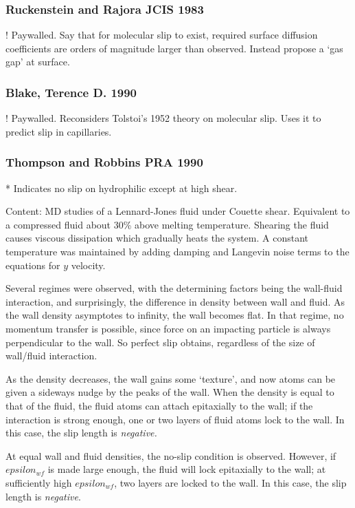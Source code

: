 \documentclass[twocolumn]{article}
\begin{document}
\subsubsection*{Ruckenstein and Rajora JCIS 1983}
! Paywalled.
Say that for molecular slip to exist, required surface diffusion coefficients are orders of magnitude larger than observed. Instead propose a `gas gap' at surface.

\subsubsection*{Blake, Terence D. 1990}
! Paywalled.
Reconsiders Tolstoi's 1952 theory on molecular slip. Uses it to predict slip in capillaries.

\subsubsection*{Thompson and Robbins PRA 1990}
* Indicates no slip on hydrophilic except at high shear.

Content: MD studies of a Lennard-Jones fluid under Couette shear. Equivalent to a compressed fluid about 30\% above melting temperature. Shearing the fluid causes viscous dissipation which gradually heats the system. A constant temperature was maintained by adding damping and Langevin noise terms to the equations for $y$ velocity.

Several regimes were observed, with the determining factors being the wall-fluid interaction, and surprisingly, the difference in density between wall and fluid. As the wall density asymptotes to infinity, the wall becomes flat.  In that regime, no momentum transfer is possible, since force on an impacting particle is always perpendicular to the wall. So perfect slip obtains, regardless of the size of wall/fluid interaction.

As the density decreases, the wall gains some `texture', and now atoms can be given a sideways nudge by the peaks of the wall. When the density is equal to that of the fluid, the fluid atoms can attach epitaxially to the wall; if the interaction is strong enough, one or two layers of fluid atoms lock to the wall.  In this case, the slip length is \emph{negative.}

At equal wall and fluid densities, the no-slip condition is observed.  However, if $epsilon_{wf}$ is made large enough, the fluid will lock epitaxially to the wall; at sufficiently high $epsilon_{wf}$, two layers are locked to the wall. In this case, the slip length is \emph{negative}.
\end{document}
